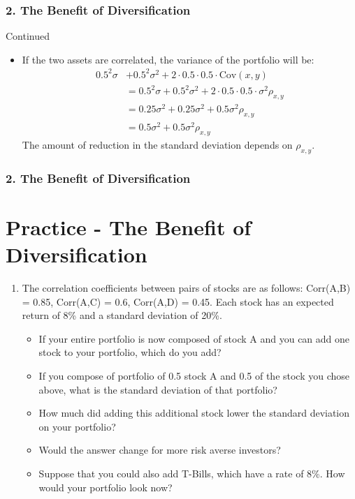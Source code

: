 \documentclass{beamer}
\begin{document}
\begin{frame}[t]
    \frametitle{2. The Benefit of Diversification}

    Continued
    \begin{itemize}
    \item If the two assets are correlated, the variance of the portfolio will be:
    \begin{align*}
        0.5^2\sigma &+ 0.5^2\sigma^2 + 2\cdot0.5\cdot0.5\cdot \text{Cov}(x,y) \\
        &=0.5^2\sigma + 0.5^2\sigma^2 + 2\cdot0.5\cdot0.5\cdot\sigma^2\rho_{x,y} \\
    &= 0.25\sigma^2 + 0.25\sigma^2 + 0.5 \sigma^2\rho_{x,y}\\
    &=0.5\sigma^2 + 0.5 \sigma^2 \rho_{x,y}
    \end{align*}
    The amount of reduction in the standard deviation depends on $\rho_{x,y}$.  
    \end{itemize}

\end{frame}

\begin{practiceframe}[t]
    \frametitle{2. The Benefit of Diversification}
        \section{Practice - The Benefit of Diversification}

    \begin{enumerate}
        \item The correlation coefficients between pairs of stocks are as follows: Corr(A,B) = 0.85,
        Corr(A,C) = 0.6, Corr(A,D) = 0.45.   Each stock has an expected return of 8\% and a standard 
        deviation of 20\%. 
        \begin{itemize}
            \item If your entire portfolio is now composed of stock A and you can add one stock to your portfolio, which do you add?
            \item If you compose of portfolio of 0.5 stock A and 0.5 of the stock you chose above, what is the standard deviation of that portfolio?
            \item How much did adding this additional stock lower the standard deviation on your portfolio?
            \item Would the answer change for more risk averse investors?
            \item Suppose that you could also add T-Bills, which have a rate of 8\%.   How would your portfolio look now?
        \end{itemize}
    \end{enumerate}

\end{practiceframe}
\end{document}
